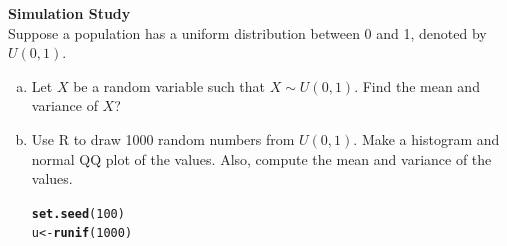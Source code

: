 \documentclass[fleqn]{article}\usepackage[]{graphicx}\usepackage[]{color}
\makeatletter
\newcommand{\hlnum}[1]{\textcolor[rgb]{0.686,0.059,0.569}{#1}}%
\newcommand{\hlstd}[1]{\textcolor[rgb]{0.345,0.345,0.345}{#1}}%
\newcommand{\hlkwb}[1]{\textcolor[rgb]{0.69,0.353,0.396}{#1}}%
\newcommand{\hlkwd}[1]{\textcolor[rgb]{0.737,0.353,0.396}{\textbf{#1}}}%
\newenvironment{kframe}{%
 \def\at@end@of@kframe{}%
 \ifinner\ifhmode%
  \def\at@end@of@kframe{\end{minipage}}%
  \begin{minipage}{\columnwidth}%
 \fi\fi%
 \def\FrameCommand##1{\hskip\@totalleftmargin \hskip-\fboxsep
 \colorbox{shadecolor}{##1}\hskip-\fboxsep
     \hskip-\linewidth \hskip-\@totalleftmargin \hskip\columnwidth}%
 \MakeFramed {\advance\hsize-\width
   \@totalleftmargin\z@ \linewidth\hsize
   \@setminipage}}%
 {\par\unskip\endMakeFramed%
 \at@end@of@kframe}
\newenvironment{knitrout}{}{} %
\makeatother
\begin{document}
\textbf{Simulation Study}\\  
Suppose a population has a uniform distribution between 0 and 1, denoted by $U(0,1)$.  
\begin{enumerate}[(a)]
\item Let $X$ be a random variable such that $X \sim U(0,1)$.  Find the mean and variance of $X$?\\
\vspace{7cm}

% 
% 

\clearpage
\item Use R to draw 1000 random numbers from $U(0,1)$.  Make a histogram and normal QQ plot of the values.  Also, compute the mean and variance of the values.
\begin{knitrout}
\color{fgcolor}\begin{kframe}
\begin{alltt}
\hlkwd{set.seed}\hlstd{(}\hlnum{100}\hlstd{)}
\hlstd{u} \hlkwb{<-} \hlkwd{runif}\hlstd{(}\hlnum{1000}\hlstd{)}


\end{alltt}
\end{kframe}
\end{knitrout}
\end{enumerate}
\end{document}
